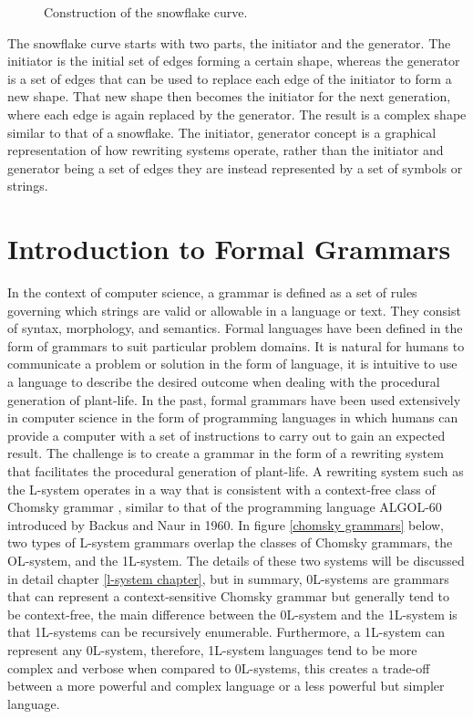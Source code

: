 \begin{figure}[htbp]
	{\centering
		\setlength{\fboxrule}{1pt}
		\vspace{7px}
		\caption{Construction of the snowflake curve\cite{prusinkiewicz2013lindenmayer}.} \label{snowflake curve}
	}
\end{figure}
\FloatBarrier

\noindent
The snowflake curve starts with two parts, the initiator and the generator. The initiator is the initial set of edges forming a certain shape, whereas the generator is a set of edges that can be used to replace each edge of the initiator to form a new shape. That new shape then becomes the initiator for the next generation, where each edge is again replaced by the generator. The result is a complex shape similar to that of a snowflake. The initiator, generator concept is a graphical representation of how rewriting systems operate, rather than the initiator and generator being a set of edges they are instead represented by a set of symbols or strings.

\section{Introduction to Formal Grammars}

In the context of computer science, a grammar is defined as a set of rules governing which strings are valid or allowable in a language or text. They consist of syntax, morphology, and semantics. Formal languages have been defined in the form of grammars to suit particular problem domains. It is natural for humans to communicate a problem or solution in the form of language, it is intuitive to use a language to describe the desired outcome when dealing with the procedural generation of plant-life. In the past, formal grammars have been used extensively in computer science in the form of programming languages in which humans can provide a computer with a set of instructions to carry out to gain an expected result. The challenge is to create a  grammar in the form of a rewriting system that facilitates the procedural generation of plant-life. A rewriting system such as the L-system operates in a way that is consistent with a context-free class of Chomsky grammar \cite{chomsky1956three}, similar to that of the programming language ALGOL-60 introduced by Backus and Naur in  1960\cite{backus1960report}. In figure \ref{chomsky grammars} below, two types of L-system grammars overlap the classes of Chomsky grammars, the OL-system, and the 1L-system. The details of these two systems will be discussed in detail chapter \ref{l-system chapter}, but in summary, 0L-systems are grammars that can represent a context-sensitive Chomsky grammar but generally tend to be context-free, the main difference between the 0L-system and the 1L-system is that 1L-systems can be recursively enumerable. Furthermore, a 1L-system can represent any 0L-system, therefore, 1L-system languages tend to be more complex and verbose when compared to 0L-systems, this creates a trade-off between a more powerful and complex language or a less powerful but simpler language. 

